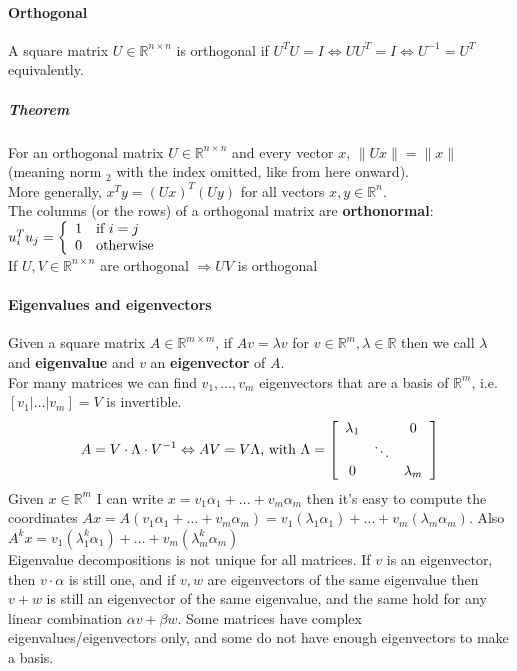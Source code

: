 \documentclass[10pt]{report}
\begin{document}
\paragraph{Orthogonal} A square matrix $U\in \mathbb{R}^{n\times n}$ is orthogonal if $U^TU = I \Leftrightarrow UU^T = I \Leftrightarrow U^{-1} = U^T$ equivalently.
\subparagraph{Theorem} For an orthogonal matrix $U\in \mathbb{R}^{n\times n}$ and every vector $x$, $\|Ux\| = \|x\|$ (meaning norm $_2$ with the index omitted, like from here onward).\\
More generally, $x^T y = (Ux)^T(Uy)$ for all vectors $x,y\in \mathbb{R}^n$.\\
The columns (or the rows) of a orthogonal matrix are \textbf{orthonormal}: $u_i^Tu_j = \left\{\begin{array}{l l}
1 &\text{if } i = j\\0&\text{otherwise}
\end{array}\right.$\\
If $U,V\in \mathbb{R}^{n\times n}$ are orthogonal $\Rightarrow UV$ is orthogonal
\paragraph{Eigenvalues and eigenvectors} Given a square matrix $A\in \mathbb{R}^{m\times m}$, if $Av = \lambda v$ for $v\in \mathbb{R}^m, \lambda\in \mathbb{R}$ then we call $\lambda$ and \textbf{eigenvalue} and $v$ an \textbf{eigenvector} of $A$.\\
For many matrices we can find $v_1,\ldots,v_m$ eigenvectors that are a basis of $\mathbb{R}^m$, i.e. $[v_1|\ldots|v_m] = V$ is invertible.\\
$$A = V\cdot\Lambda\cdot V^{-1}\Leftrightarrow AV = V\Lambda\text{, with }\Lambda = \left[\begin{array}{c c c}
\lambda_1 & & 0\\
& \ddots \\
0& & \lambda_m
\end{array}\right]$$
Given $x\in \mathbb{R}^m$ I can write $x = v_1\alpha_1 + \ldots + v_m\alpha_m$ then it's easy to compute the coordinates $Ax = A(v_1\alpha_1 + \ldots + v_m\alpha_m) = v_1(\lambda_1\alpha_1) + \ldots + v_m(\lambda_m\alpha_m)$. Also $A^kx = v_1(\lambda_1^k\alpha_1) + \ldots + v_m(\lambda_m^k\alpha_m)$\\
Eigenvalue decompositions is not unique for all matrices. If $v$ is an eigenvector, then $v\cdot\alpha$ is still one, and if $v,w$ are eigenvectors of the same eigenvalue then $v+w$ is still an eigenvector of the same eigenvalue, and the same hold for any linear combination $\alpha v+\beta w$. Some matrices have complex eigenvalues/eigenvectors only, and some do not have enough eigenvectors to make a basis.
\end{document}
